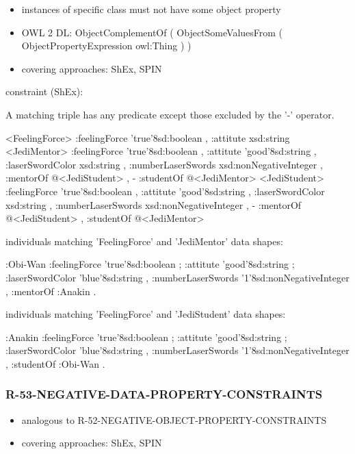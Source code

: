 \documentclass{llncs}
\begin{document}
\begin{itemize}
	\item instances of specific class must not have some object property
  \item OWL 2 DL: ObjectComplementOf ( ObjectSomeValuesFrom ( ObjectPropertyExpression owl:Thing ) )
	\item covering approaches: ShEx, SPIN
\end{itemize}

constraint (ShEx):

A matching triple has any predicate except those excluded by the '-' operator.

\begin{ex}
<FeelingForce> {
    :feelingForce 'true'^^xsd:boolean ,
    :attitute xsd:string }
<JediMentor> {
    :feelingForce 'true'^^xsd:boolean ,
    :attitute 'good'^^xsd:string ,
    :laserSwordColor xsd:string ,
    :numberLaserSwords xsd:nonNegativeInteger ,
    :mentorOf @<JediStudent> ,
    - :studentOf @<JediMentor> }
<JediStudent> {
    :feelingForce 'true'^^xsd:boolean ,
    :attitute 'good'^^xsd:string ,
    :laserSwordColor xsd:string ,
    :numberLaserSwords xsd:nonNegativeInteger ,
    - :mentorOf @<JediStudent> ,
    :studentOf @<JediMentor> }
\end{ex}

individuals matching 'FeelingForce' and 'JediMentor' data shapes:

\begin{ex}
:Obi-Wan 
    :feelingForce 'true'^^xsd:boolean ;
    :attitute 'good'^^xsd:string ;
    :laserSwordColor 'blue'^^xsd:string ,
    :numberLaserSwords '1'^^xsd:nonNegativeInteger ,
    :mentorOf :Anakin .
\end{ex}

individuals matching 'FeelingForce' and 'JediStudent' data shapes:

\begin{ex}
:Anakin 
    :feelingForce 'true'^^xsd:boolean ;
    :attitute 'good'^^xsd:string ;
    :laserSwordColor 'blue'^^xsd:string ,
    :numberLaserSwords '1'^^xsd:nonNegativeInteger ,
    :studentOf :Obi-Wan . 
\end{ex}

\subsubsection{R-53-NEGATIVE-DATA-PROPERTY-CONSTRAINTS}

\begin{itemize}
	\item analogous to R-52-NEGATIVE-OBJECT-PROPERTY-CONSTRAINTS
	\item covering approaches: ShEx, SPIN
\end{itemize}
\end{document}
